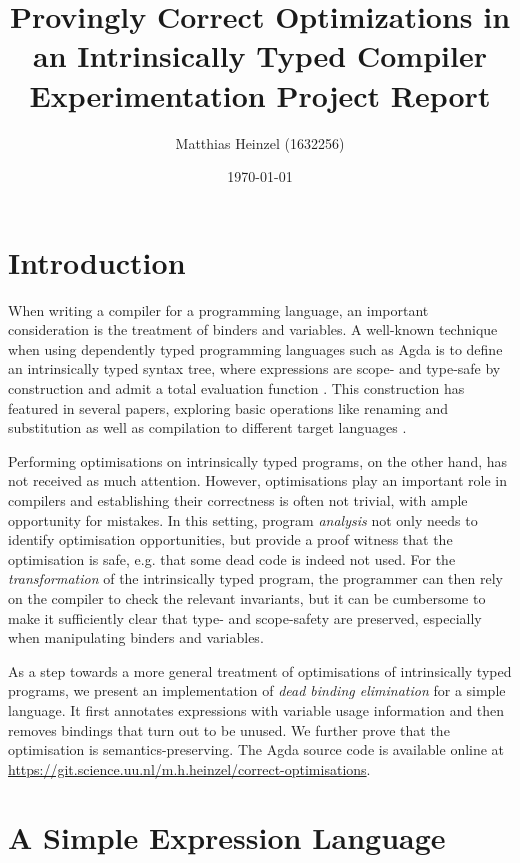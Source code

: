 \documentclass[11pt,a4paper]{article}
\title{Provingly Correct Optimizations in an Intrinsically Typed Compiler\\
  \vspace{1cm}
  \large Experimentation Project Report}
\author{Matthias Heinzel (1632256)}
\date{\today}
\begin{document}
\maketitle
\tableofcontents
\pagebreak

\section{Introduction}

When writing a compiler for a programming language,
an important consideration is the treatment of binders and variables.
A well-known technique when using dependently typed programming languages such as Agda
\cite{norell2007agda}
is to define an intrinsically typed syntax tree,
where expressions are scope- and type-safe by construction and admit a total evaluation function
\cite{augustsson1999intrinsic}.
This construction has featured in several papers, exploring
basic operations like renaming and substitution
\cite{allais2018universe}
as well as compilation to different target languages
\cite[supplemental material]{pickard2021calculating}.

Performing optimisations on intrinsically typed programs, on the other hand,
has not received as much attention.
However, optimisations play an important role in compilers
and establishing their correctness is often not trivial,
with ample opportunity for mistakes.
%
In this setting, program \emph{analysis} not only needs to identify optimisation opportunities,
but provide a proof witness that the optimisation is safe,
e.g. that some dead code is indeed not used.
For the \emph{transformation} of the intrinsically typed program,
the programmer can then rely on the compiler to check the relevant invariants,
but it can be cumbersome to make it sufficiently clear that type- and scope-safety are preserved,
especially when manipulating binders and variables.

As a step towards a more general treatment of optimisations of intrinsically typed programs,
we present an implementation of \emph{dead binding elimination} for a simple language.
It first annotates expressions with variable usage information
and then removes bindings that turn out to be unused.
We further prove that the optimisation is semantics-preserving.
The Agda source code is available online at
\url{https://git.science.uu.nl/m.h.heinzel/correct-optimisations}.

\section{A Simple Expression Language}
\end{document}
